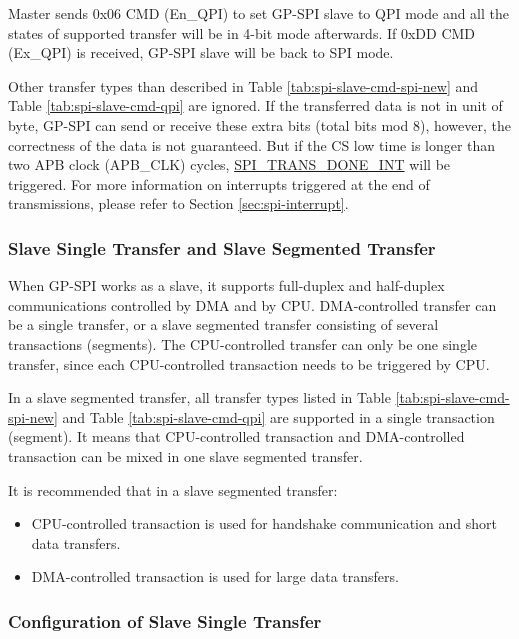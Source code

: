 \documentclass[main\_\_EN.tex]{subfiles}
\begin{document}
Master sends 0x{}06 CMD (En\_QPI) to set GP-SPI slave to QPI mode and all the states of supported transfer will be in 4-bit mode afterwards. If 0x{}DD CMD (Ex\_QPI) is received, GP-SPI slave will be back to SPI mode.

Other transfer types than described in Table \ref{tab:spi-slave-cmd-spi-new} and Table \ref{tab:spi-slave-cmd-qpi} are ignored. If the transferred data is not in unit of byte, GP-SPI can send or receive these extra bits (total bits mod 8), however, the correctness of the data is not guaranteed. But if the CS low time is longer than two APB clock (APB\_CLK) cycles, \hyperref[int:SPITRANSDONEINT]{SPI\_TRANS\_DONE\_INT} will be triggered. For more information on interrupts triggered at the end of transmissions, please refer to Section \ref{sec:spi-interrupt}.


\subsubsection{Slave Single Transfer and Slave Segmented Transfer}\label{sec:gp-spi2-slave-seg-trans}

When GP-SPI works as a slave, it supports full-duplex and half-duplex communications controlled by DMA and by CPU. DMA-controlled transfer can be a single transfer, or a slave segmented transfer consisting of several transactions (segments). The CPU-controlled transfer can only be one single transfer, since each CPU-controlled transaction needs to be triggered by CPU.

In a slave segmented transfer, all transfer types listed in Table \ref{tab:spi-slave-cmd-spi-new} and Table \ref{tab:spi-slave-cmd-qpi} are supported in a single transaction (segment). It means that CPU-controlled transaction and DMA-controlled transaction can be mixed in one slave segmented transfer.

It is recommended that in a slave segmented transfer:

\begin{itemize}
    \item CPU-controlled transaction is used for handshake communication and short data transfers.

    \item  DMA-controlled transaction is used for large data transfers.
\end{itemize}


\subsubsection{Configuration of Slave Single Transfer}\label{GP-SPI slave single transfer}
\end{document}
